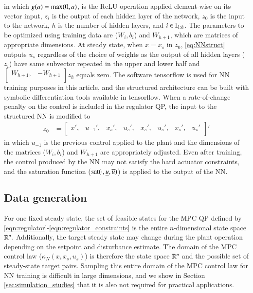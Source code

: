 \documentclass[preprint,5p, twocolumn, authoryear]{elsarticle}
\begin{document}
in which $g(a) = \textnormal{max} (0, a)$, is the ReLU operation applied
element-wise on its vector input, $z_i$ is the output of each hidden layer of
the network, $z_0$ is the input to the network, $h$ is the number of hidden
layers, and $i \in \mathbb{I}_{1:h}$. The parameters to be optimized using training
data are ($W_i, b_i$) and $W_{h+1}$, which are matrices of appropriate
dimensions. At steady state, when $x=x_s$ in $z_0$, \eqref{eq:NNstruct} outputs
$u_s$ regardless of the choice of weights as the output of all hidden layers
($z_i$) have same subvector repeated in the upper and lower half and
$\begin{bmatrix} W_{h + 1}, & -W_{h+ 1} \\
      \end{bmatrix} z_h$ equals zero. The software tensorflow
\citep{abadi:agarwal:barham:brevdo:et-al:2015} is used for NN training purposes
in this article, and the structured architecture can be built with symbolic
differentiation tools available in tensorflow. When a rate-of-change penalty on
the control is included in the regulator QP, the input to the structured NN is
modified to 
\begin{align*}
    z_0 &= 
    \begin{bmatrix}
    x', & u_{-1}', & x_s', & u_s', & x_s', & u_s', & x_s', & u_s' \\
    \end{bmatrix}'
\end{align*}
in which $u_{-1}$ is the previous control applied to the plant and the
dimensions of the matrices ($W_i, b_i$) and $W_{h+1}$ are appropriately
adjusted. Even after training, the control produced by the NN may not satisfy
the hard actuator constraints, and the saturation function
($\textnormal{sat}(\cdot, \underline{u}, \overline{u})$) is applied to the
output of the NN.

\subsection{Data generation}

For one fixed steady state, the set of feasible states for the MPC QP defined by
\eqref{eqn:regulator}-\eqref{eqn:regulator_constraints} is the entire
$n$-dimensional state space $\mathbb{R}^n$. Additionally, the target steady state may
change during the plant operation depending on the setpoint and disturbance
estimate. The domain of the MPC control law ($\kappa_N(x, x_s, u_s)$) is
therefore the state space $\mathbb{R}^{n}$ and the possible set of steady-state target
pairs. Sampling this entire domain of the MPC control law for NN training is
difficult in large dimensions, and we show in Section
\ref{sec:simulation_studies} that it is also not required for practical
applications. 
\end{document}
